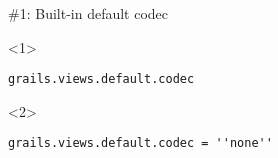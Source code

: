 \begin{frame}

    \vspace{.5cm}

    \begin{center}
      \Huge \#1: Built-in default codec \\
    \end{center}

    \vspace{1cm}

    \begin{onlyenv}<1>
    \begin{center}
      \begin{minipage}{.9\textwidth}
        \begin{verbatim}
grails.views.default.codec
        \end{verbatim}
      \end{minipage}
    \end{center}
    \end{onlyenv}

    \begin{onlyenv}<2>
    \begin{center}
      \begin{minipage}{.9\textwidth}
        \begin{verbatim}
grails.views.default.codec = ''none''
        \end{verbatim}
      \end{minipage}
    \end{center}
    \end{onlyenv}

\end{frame}

